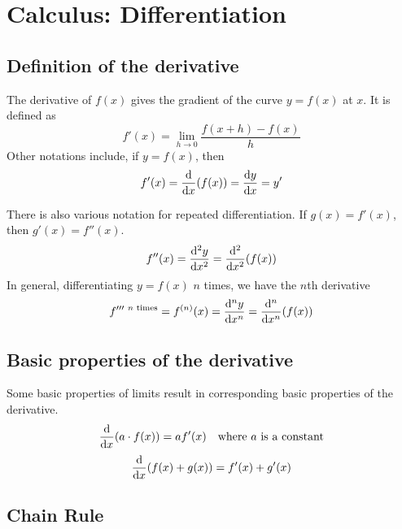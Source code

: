 \section{Calculus: Differentiation}


\subsection{Definition of the derivative}

The derivative of \(f(x)\) gives the gradient of the curve \(y = f(x)\) at
\(x\). It is defined as
\begin{equation}
f'(x) = \lim_{h \to 0} \frac{f(x + h) - f(x)}{h}
\end{equation}
Other notations include, if \(y = f(x)\), then
\begin{equation}
f'(x) = \dv{x}(f(x)) = \dv{y}{x} = y'
\end{equation}

There is also various notation for repeated differentiation. If
\(g(x) = f'(x)\), then \(g'(x) = f''(x)\).
\begin{equation*}
f''(x) = \dv[2]{y}{x} = \dv[2]{x}(f(x))
\end{equation*}
In general, differentiating \(y = f(x)\) \(n\) times, we have the \(n\)th
derivative
\begin{equation*}
f'''^{\ \text{\(n\) times}} = f^{(n)}(x) = \dv[n]{y}{x} = \dv[n]{x}(f(x))
\end{equation*}

\subsection{Basic properties of the derivative}
\label{sec_calc_derivative_properties}

Some basic properties of limits result in corresponding basic properties of
the derivative.
\begin{equation*}
\dv{x}(a \cdot f(x)) = af'(x) \quad \text{where \(a\) is a constant}
\end{equation*}
\begin{equation*}
\dv{x}(f(x) + g(x)) = f'(x) + g'(x)
\end{equation*}

\subsection{Chain Rule} \label{sec_calc_chain}

